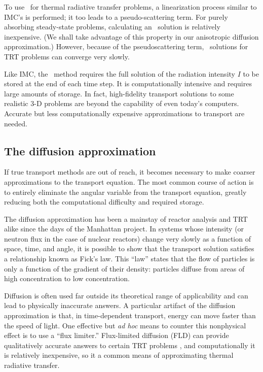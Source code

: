 To use \SN\ for thermal radiative transfer problems, a linearization process
similar to IMC's is performed; it too leads to a pseudo-scattering term.
For purely absorbing steady-state problems, calculating an \SN\ solution is
relatively inexpensive. (We shall take advantage of this property in our
anisotropic diffusion approximation.) However, because of the pseudoscattering
term, \SN\ solutions for TRT problems can converge very slowly.

Like IMC, the \SN\ method requires the full solution of the radiation intensity
$I$ to be stored at the end of each time step. It is
computationally intensive and requires large amounts of storage. In fact,
high-fidelity transport solutions to some realistic 3-D problems are beyond the
capability of even today's computers. Accurate but less computationally
expensive approximations to transport are needed.

\subsection{The diffusion approximation}
If true transport methods are out of reach, it becomes necessary to make
coarser approximations to the transport equation.
The most common course of action is to entirely eliminate the angular variable
from the transport equation, greatly reducing both the computational difficulty
and required storage.

The diffusion approximation has been a mainstay of reactor analysis and TRT
alike since the days of the Manhattan project. In systems whose intensity (or
neutron flux
in the case of nuclear reactors) change very slowly as a function of space, time, and
angle, it is possible to show \cite{Lar1975,Lar1983a} that the transport
solution satisfies a relationship known as Fick's law. This ``law'' states that
the flow of particles is only a function of the gradient of their density:
particles diffuse from areas of high concentration to low concentration.

Diffusion is often used far outside its theoretical range of applicability and
can lead to physically inaccurate answers. A particular artifact of the
diffusion approximation is that, in time-dependent transport, energy can
move faster than the speed of light. One effective but \emph{ad hoc} means to
counter this nonphysical effect is to use a ``flux limiter.''
Flux-limited diffusion (FLD) can provide qualitatively accurate answers to
certain TRT problems \cite{Ols2000}, and computationally it is relatively
inexpensive, so it a common means of approximating thermal radiative transfer.

